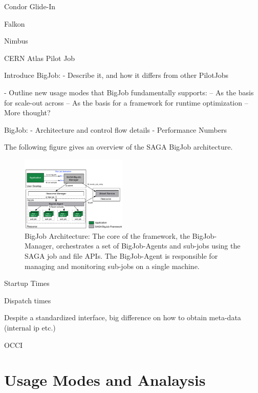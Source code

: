 \documentclass[conference,final]{IEEEtran}
\begin{document}

Condor Glide-In

Falkon

Nimbus

CERN Atlas Pilot Job~\cite{1555338}


Introduce BigJob:
 - Describe it, and how it differs from other PilotJobs

 - Outline new usage modes that BigJob fundamentally supports:
    -- As the basis for scale-out across
    -- As the basis for a framework for runtime optimization
    -- More thought?

BigJob:
 - Architecture and control flow details
 - Performance Numbers



The following figure gives an overview of the SAGA BigJob architecture.

\begin{figure}[htbp]
    \centering
    \includegraphics[width=0.45\textwidth]{figures/bigjob}
    \caption{BigJob Architecture: The core of the framework, the BigJob-Manager,
     orchestrates a set of BigJob-Agents and sub-jobs using the SAGA job and file APIs. 
     The BigJob-Agent is responsible for managing and monitoring sub-jobs on a 
     single machine.}
    \label{fig:figures_bigjob}
\end{figure}



Startup Times

Dispatch times



Despite a standardized interface, big difference on how to obtain meta-data (internal ip etc.)

OCCI

\section{Usage Modes and Analaysis}
\end{document}
